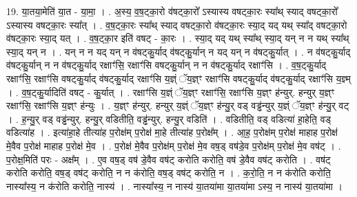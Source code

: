 \documentclass[17pt]{extarticle}
\begin{document}
19. या॒तया॒मेति॑ या॒त - या॒मा॒ । . अ॒स्य॒ व॒ष॒ट्का॒रो व॑षट्का॒रो᳚ ऽस्यास्य वषट्का॒रः स्या᳚थ् स्याद् वषट्का॒रो᳚ ऽस्यास्य वषट्का॒रः स्या᳚त् । . व॒ष॒ट्का॒रः स्या᳚थ् स्याद् वषट्का॒रो व॑षट्का॒रः स्या॒द् यद् यथ् स्या᳚द् वषट्का॒रो व॑षट्का॒रः स्या॒द् यत् । . व॒ष॒ट्का॒र इति॑ वषट् - का॒रः । . स्या॒द् यद् यथ् स्या᳚थ् स्या॒द् यन् न न यथ् स्या᳚थ् स्या॒द् यन् न । . यन् न न यद् यन् न व॑षट्कु॒र्याद् व॑षट्कु॒र्यान् न यद् यन् न व॑षट्कु॒र्यात् । . न व॑षट्कु॒र्याद् व॑षट्कु॒र्यान् न न व॑षट्कु॒र्याद् रक्षाꣳ॑सि॒ रक्षाꣳ॑सि वषट्कु॒र्यान् न न व॑षट्कु॒र्याद् रक्षाꣳ॑सि । . व॒ष॒ट्कु॒र्याद् रक्षाꣳ॑सि॒ रक्षाꣳ॑सि वषट्कु॒र्याद् व॑षट्कु॒र्याद् रक्षाꣳ॑सि य॒ज्ञ्ं ॅय॒ज्ञ्ꣳ रक्षाꣳ॑सि वषट्कु॒र्याद् व॑षट्कु॒र्याद् रक्षाꣳ॑सि य॒ज्ञ्म् । . व॒ष॒ट्कु॒र्यादिति॑ वषट् - कु॒र्यात् । . रक्षाꣳ॑सि य॒ज्ञ्ं ॅय॒ज्ञ्ꣳ रक्षाꣳ॑सि॒ रक्षाꣳ॑सि य॒ज्ञ्ꣳ ह॑न्युर्. हन्युर् य॒ज्ञ्ꣳ रक्षाꣳ॑सि॒ रक्षाꣳ॑सि य॒ज्ञ्ꣳ ह॑न्युः । . य॒ज्ञ्ꣳ ह॑न्युर्. हन्युर् य॒ज्ञ्ं ॅय॒ज्ञ्ꣳ ह॑न्यु॒र् वड् वड्ढ॑न्युर् य॒ज्ञ्ं ॅय॒ज्ञ्ꣳ ह॑न्यु॒र् वट् । . ह॒न्यु॒र् वड् वड्ढ॑न्युर्. हन्यु॒र् वडितीति॒ वड्ढ॑न्युर्. हन्यु॒र् वडिति॑ । . वडितीति॒ वड् वडित्या॑ हा॒हेति॒ वड् वडित्या॑ह । . इत्या॑हा॒हे तीत्या॑ह प॒रोक्ष॑म् प॒रोक्ष॑ मा॒हे तीत्या॑ह प॒रोक्ष᳚म् । . आ॒ह॒ प॒रोक्ष॑म् प॒रोक्ष॑ माहाह प॒रोक्ष॑ मे॒वैव प॒रोक्ष॑ माहाह प॒रोक्ष॑ मे॒व । . प॒रोक्ष॑ मे॒वैव प॒रोक्ष॑म् प॒रोक्ष॑ मे॒व वष॒ड् वष॑डे॒व प॒रोक्ष॑म् प॒रोक्ष॑ मे॒व वष॑ट् । . प॒रोक्ष॒मिति॑ परः - अक्ष᳚म् । . ए॒व वष॒ड् वष॑ डे॒वैव वष॑ट् करोति करोति॒ वष॑ डे॒वैव वष॑ट् करोति । . वष॑ट् करोति करोति॒ वष॒ड् वष॑ट् करोति॒ न न क॑रोति॒ वष॒ड् वष॑ट् करोति॒ न । . क॒रो॒ति॒ न न क॑रोति करोति॒ नास्या᳚स्य॒ न क॑रोति करोति॒ नास्य॑ । . नास्या᳚स्य॒ न नास्य॑ या॒तया॑मा या॒तया॑मा ऽस्य॒ न नास्य॑ या॒तया॑मा । \newline
\end{document}
